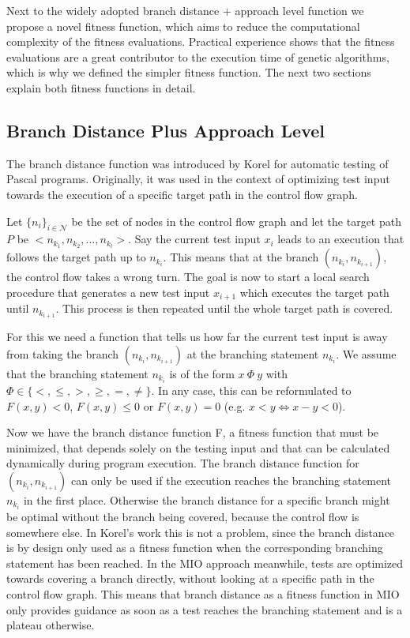 \documentclass[
  a4paper,  %
  twoside,  %
  bibliography=totoc,
  headsepline,
  cleardoublepage=empty,
  parskip=half,
  draft=false
]{scrbook}
\begin{document}
Next to the widely adopted branch distance + approach level function we propose a novel fitness function, which aims to reduce the computational complexity of the fitness evaluations.
Practical experience shows that the fitness evaluations are a great contributor to the execution time of genetic algorithms, which is why we defined the simpler fitness function.
The next two sections explain both fitness functions in detail. 

\subsection{Branch Distance Plus Approach Level}\label{branch}

The branch distance function was introduced by Korel \cite{korel1990automated} for automatic testing of Pascal programs.
Originally, it was used in the context of optimizing test input towards the execution of a specific target path in the control flow graph.

Let $\{n_i\}_{i \in \mathcal{N}}$ be the set of nodes in the control flow graph and let the target path $P$ be ${<n_{k_1}, n_{k_2}, ..., n_{k_l}>}$.
Say the current test input $x_i$ leads to an execution that follows the target path up to $n_{k_i}$.
This means that at the branch $(n_{k_i}, n_{k_{i+1}})$, the control flow takes a wrong turn.
The goal is now to start a local search procedure that generates a new test input $x_{i+1}$ which executes the target path until $n_{k_{i+1}}$.
This process is then repeated until the whole target path is covered.

For this we need a function that tells us how far the current test input is away from taking the branch $(n_{k_i}, n_{k_{i+1}})$ at the branching statement $n_{k_i}$.
We assume that the branching statement $n_{k_i}$ is of the form $x\ \Phi\ y$ with $\Phi \in \{<, \leq, >, \geq, =, \neq\}$.
In any case, this can be reformulated to $F(x, y) < 0$, $F(x, y) \leq 0$ or $F(x, y) = 0$ (e.g. $x < y \Leftrightarrow x - y < 0$).

Now we have the branch distance function F, a fitness function that must be minimized, that depends solely on the testing input and that can be calculated dynamically during program execution.
The branch distance function for $(n_{k_i}, n_{k_{i+1}})$ can only be used if the execution reaches the branching statement $n_{k_i}$ in the first place. Otherwise the branch distance for a specific branch might be optimal without the branch being covered, because the control flow is somewhere else.
In Korel's \cite{korel1990automated} work this is not a problem, since the branch distance is by design only used as a fitness function when the corresponding branching statement has been reached. 
In the MIO approach meanwhile, tests are optimized towards covering a branch directly, without looking at a specific path in the control flow graph.
This means that branch distance as a fitness function in MIO only provides guidance as soon as a test reaches the branching statement and is a plateau otherwise.
\end{document}
